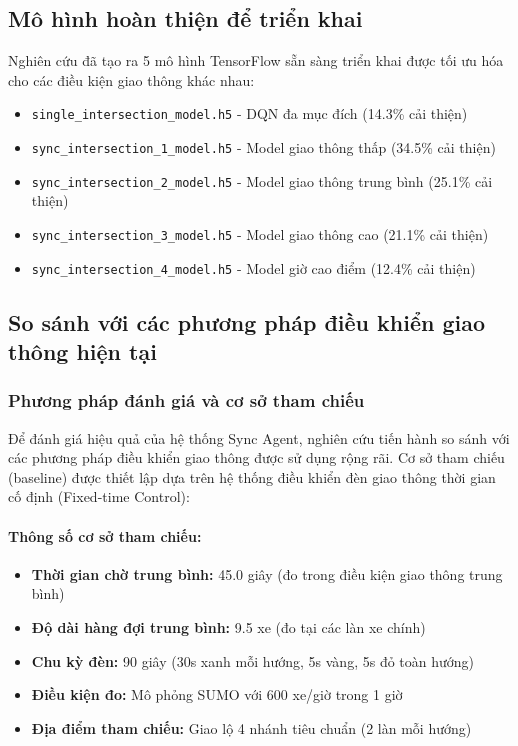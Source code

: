 \subsection{Mô hình hoàn thiện để triển khai}

Nghiên cứu đã tạo ra 5 mô hình TensorFlow sẵn sàng triển khai được tối ưu hóa 
cho các điều kiện giao thông khác nhau:

\begin{itemize}
    \item \texttt{single\_intersection\_model.h5} - DQN đa mục đích (14.3\% cải thiện)
    \item \texttt{sync\_intersection\_1\_model.h5} - Model giao thông thấp (34.5\% cải thiện)
    \item \texttt{sync\_intersection\_2\_model.h5} - Model giao thông trung bình (25.1\% cải thiện)  
    \item \texttt{sync\_intersection\_3\_model.h5} - Model giao thông cao (21.1\% cải thiện)
    \item \texttt{sync\_intersection\_4\_model.h5} - Model giờ cao điểm (12.4\% cải thiện)
\end{itemize}

\subsection{So sánh với các phương pháp điều khiển giao thông hiện tại}

\subsubsection{Phương pháp đánh giá và cơ sở tham chiếu}

Để đánh giá hiệu quả của hệ thống Sync Agent, nghiên cứu tiến hành so sánh với các phương pháp điều khiển giao thông được sử dụng rộng rãi. Cơ sở tham chiếu (baseline) được thiết lập dựa trên hệ thống điều khiển đèn giao thông thời gian cố định (Fixed-time Control):

\paragraph{Thông số cơ sở tham chiếu:}
\begin{itemize}
    \item \textbf{Thời gian chờ trung bình:} 45.0 giây (đo trong điều kiện giao thông trung bình)
    \item \textbf{Độ dài hàng đợi trung bình:} 9.5 xe (đo tại các làn xe chính)
    \item \textbf{Chu kỳ đèn:} 90 giây (30s xanh mỗi hướng, 5s vàng, 5s đỏ toàn hướng)
    \item \textbf{Điều kiện đo:} Mô phỏng SUMO với 600 xe/giờ trong 1 giờ
    \item \textbf{Địa điểm tham chiếu:} Giao lộ 4 nhánh tiêu chuẩn (2 làn mỗi hướng)
\end{itemize}

